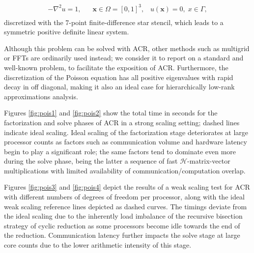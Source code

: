\documentclass[]{elsarticle}
\begin{document}
\begin{equation}
\begin{aligned}
-\nabla^{2} u  = 1, \;\;\; &\mathbf{x} \in \Omega = [0,1]^3,  \;\;\; u(\mathbf{x}) = 0, \; x \in \Gamma, \\
\end{aligned}
\label{poissonEquation}
\end{equation}
discretized with the 7-point finite-difference star stencil, which leads to a symmetric positive definite linear system.

Although this problem can be solved with ACR, other methods such as multigrid or FFTs are ordinarily used instead; we consider it to report on a standard and well-known problem, to facilitate the exposition of ACR. Furthermore, the discretization of the Poisson equation has all positive eigenvalues with rapid decay in off diagonal, making it also an ideal case for hierarchically low-rank approximations analysis.

Figures \ref{fig:pois1} and \ref{fig:pois2} show the total time in seconds for the factorization and solve phases of ACR in a strong scaling setting; dashed lines indicate ideal scaling. Ideal scaling of the factorization stage deteriorates at large processor counts as factors such as communication volume and hardware latency begin to play a significant role; the same factors tend to dominate even more during the solve phase, being the latter a sequence of fast $\mathcal{H}$-matrix-vector multiplications with limited availability of communication/computation overlap. 

Figures \ref{fig:pois3} and \ref{fig:pois4} depict the results of a weak scaling test for ACR with different numbers of degrees of freedom per processor, along with the ideal weak scaling reference lines depicted as dashed curves. The timings deviate from the ideal scaling due to the inherently load imbalance of the recursive bisection strategy of cyclic reduction as some processors become idle towards the end of the reduction. Communication latency further impacts the solve stage at large core counts due to the lower arithmetic intensity of this stage.
\end{document}
